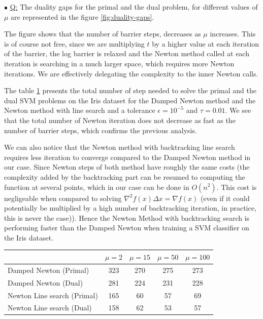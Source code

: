 \documentclass[a4paper, 11pt]{article}
\newcounter{cquestion}[subsection]
\renewcommand{\thecquestion}{\arabic{cquestion}}
\newenvironment{question}
{\par \vspace{0.5em} \noindent \stepcounter{cquestion} \hspace{-1em}
 $\bullet$ \underline{Q\thecquestion :}}
{}
\begin{document}
\newpage
\begin{question}
  The duality gaps for the primal and the dual problem, for different
  values of $\mu$ are represented in the figure
  \ref{fig:duality-gaps}.

  The figure shows that the number of barrier steps, decreases as
  $\mu$ increases. This is of course not free, since we are
  multiplying $t$ by a higher value at each iteration of the barrier,
  the log barrier is relaxed and the Newton method called at each
  iteration is searching in a much larger space, which requires more
  Newton iterations. We are effectively delegating the complexity to
  the inner Newton calls.

  The table \ref{tab:iteration-mu} presents the total number of step
  needed to solve the primal and the dual SVM problems on the Iris
  dataset for the Damped Newton method and the Newton method with line
  search and a tolerance $\epsilon = 10^{-5}$ and $\tau = 0.01$.
  We see that the total number of Newton iteration does not decrease
  as fast as the number of barrier steps, which confirms the previous
  analysis.

  We can also notice that the Newton method with backtracking line
  search requires less iteration to converge compared to the Damped
  Newton method in our case.  Since Newton steps of both method have
  roughly the same costs (the complexity added by the backtracking
  part can be resumed to computing the function at several points,
  which in our case can be done in $O(n^2)$. This cost is negligeable
  when compared to solving $\nabla^2f(x) \Delta x = \nabla f(x)$ (even
  if it could potentially be multiplied by a high number of
  backtracking iteration, in practice, this is never the case)). Hence
  the Newton Method with backtracking search is performing faster than
  the Damped Newton when training a SVM classifier on the Iris dataset.


  \begin{table}[h!]
    \centering
    \begin{tabular}{|l|c|c|c|c|}
      \hline
      & $\mu = 2$ & $\mu = 15$ & $\mu = 50$ & $\mu = 100$ \\
      \hline
      Damped Newton (Primal) & 323 & 270 & 275 & 273 \\
      Damped Newton (Dual)   & 281 & 224 & 231 & 228 \\
      \hline
      Newton Line search (Primal) & 165 & 60 & 57 & 69 \\
      Newton Line search (Dual)   & 158 & 62 & 53 & 57 \\
      \hline
    \end{tabular}
     \label{tab:iteration-mu}
  \end{table}



\end{question}
\end{document}
